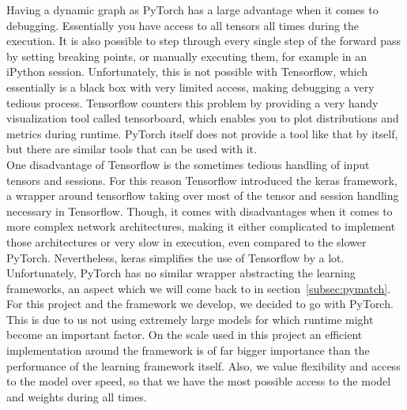 \documentclass[11pt,a4paper]{article}
\begin{document}
	Having a dynamic graph as PyTorch has a large advantage when it comes to debugging.
	Essentially you have access to all tensors all times during the execution.
	It is also possible to step through every single step of the forward pass by setting breaking points, or manually executing them, for example in an iPython session.
	Unfortunately, this is not possible with Tensorflow, which essentially is a black box with very limited access, making debugging a very tedious process.
	Tensorflow counters this problem by providing a very handy visualization tool called tensorboard, which enables you to plot distributions and metrics during runtime.
	PyTorch itself does not provide a tool like that by itself, but there are similar tools that can be used with it.\\

	One disadvantage of Tensorflow is the sometimes tedious handling of input tensors and sessions.
	For this reason Tensorflow introduced the keras framework, a wrapper around tensorflow taking over most of the tensor and session handling necessary in Tensorflow.
	Though, it comes with disadvantages when it comes to more complex network architectures, making it either complicated to implement those architectures or very slow in execution, even compared to the slower PyTorch. %
	Nevertheless, keras simplifies the use of Tensorflow by a lot.
	Unfortunately, PyTorch has no similar wrapper abstracting the learning frameworks, an aspect which we will come back to in section~\ref{subsec:pymatch}.\\

	For this project and the framework we develop, we decided to go with PyTorch.\\
	This is due to us not using extremely large models for which runtime might become an important factor.
	On the scale used in this project an efficient implementation around the framework is of far bigger importance than the performance of the learning framework itself.
	Also, we value flexibility and access to the model over speed, so that we have the most possible access to the model and weights during all times.\\
\end{document}
